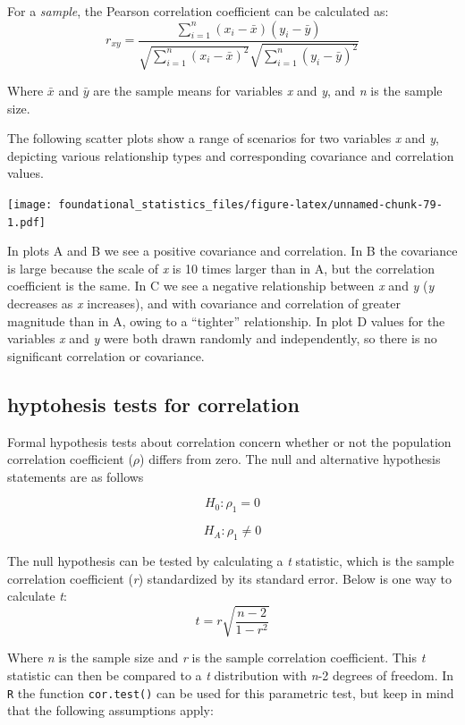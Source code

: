 \documentclass[]{book}
\begin{document}
For a \emph{sample}, the Pearson correlation coefficient can be calculated as:
\[r_{xy}=\frac{\sum_{i=1}^n (x_i-\bar{x})(y_i-\bar{y})}{\sqrt{\sum_{i=1}^n (x_i-\bar{x})^2}\sqrt{\sum_{i=1}^n (y_i-\bar{y})^2}}\]

Where \(\bar{x}\) and \(\bar{y}\) are the sample means for variables \emph{x} and \emph{y}, and \emph{n} is the sample size.

The following scatter plots show a range of scenarios for two variables \emph{x} and \emph{y}, depicting various relationship types and corresponding covariance and correlation values.

\texttt{[image: foundational\_statistics\_files/figure-latex/unnamed-chunk-79-1.pdf]}

In plots A and B we see a positive covariance and correlation. In B the covariance is large because the scale of \emph{x} is 10 times larger than in A, but the correlation coefficient is the same. In C we see a negative relationship between \emph{x} and \emph{y} (\emph{y} decreases as \emph{x} increases), and with covariance and correlation of greater magnitude than in A, owing to a ``tighter'' relationship. In plot D values for the variables \emph{x} and \emph{y} were both drawn randomly and independently, so there is no significant correlation or covariance.

\hypertarget{hyptohesis-tests-for-correlation}{%
\subsection{hyptohesis tests for correlation}\label{hyptohesis-tests-for-correlation}}

Formal hypothesis tests about correlation concern whether or not the population correlation coefficient (\(\rho\)) differs from zero. The null and alternative hypothesis statements are as follows

\[H_0 : \rho_1 = 0\]

\[H_A: \rho_1 \neq 0\]

The null hypothesis can be tested by calculating a \emph{t} statistic, which is the sample correlation coefficient (\emph{r}) standardized by its standard error. Below is one way to calculate \emph{t}:
\[t=r\sqrt{\frac{n-2}{1-r^2}}\]

Where \emph{n} is the sample size and \emph{r} is the sample correlation coefficient. This \emph{t} statistic can then be compared to a \emph{t} distribution with \emph{n}-2 degrees of freedom. In \texttt{R} the function \texttt{cor.test()} can be used for this parametric test, but keep in mind that the following assumptions apply:
\end{document}
